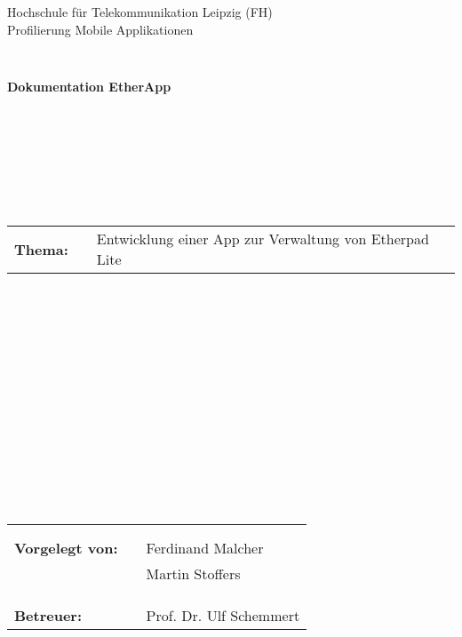 \thispagestyle{empty}
\begin{center}
\Large{Hochschule für Telekommunikation Leipzig (FH)}\\

\Large{Profilierung Mobile Applikationen}\\
\end{center}
\begin{verbatim}


\end{verbatim}
\begin{center}
\textbf{\Huge{Dokumentation EtherApp}}
\end{center}
\begin{verbatim}








\end{verbatim}
\begin{flushleft}
\begin{tabular}{llp{12cm}}
\textbf{Thema:} & & \LARGE{Entwicklung einer App zur Verwaltung von Etherpad Lite}\\
\end{tabular}
\end{flushleft}
\begin{verbatim}
















\end{verbatim}
\begin{flushleft}
\begin{tabular}{lll}
& & \\
& & \\
\textbf{Vorgelegt von:} & & Ferdinand Malcher \\
                        & & Martin Stoffers \\
& & \\
& & \\
& & \\
\textbf{Betreuer:} & & Prof. Dr. Ulf Schemmert
\end{tabular}
\end{flushleft}
